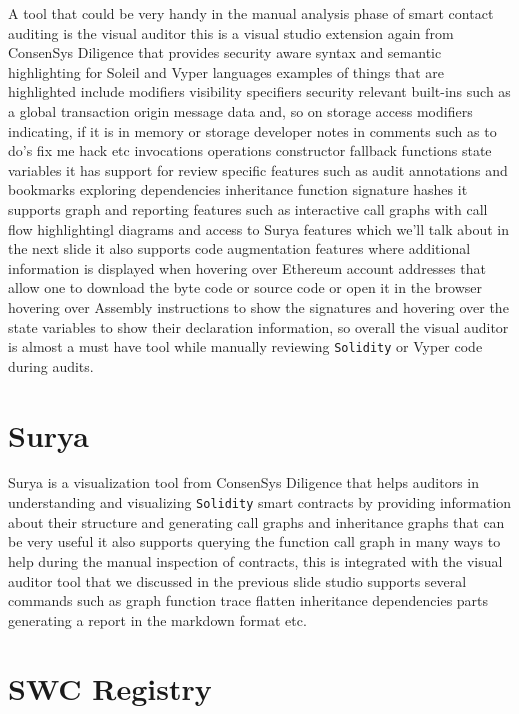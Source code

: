 A tool that could be very handy in the manual analysis phase of smart contact auditing is the visual auditor this is a visual studio extension again from ConsenSys Diligence that provides security aware syntax and semantic highlighting for Soleil and Vyper languages examples of things that are highlighted include modifiers visibility specifiers security relevant built-ins such as a global transaction origin message data and, so on storage access modifiers indicating, if it is in memory or storage developer notes in comments such as to do's fix me hack etc invocations operations constructor fallback functions state variables it has support for review specific features such as audit annotations and bookmarks exploring dependencies inheritance function signature hashes it supports graph and reporting features such as interactive call graphs with call flow highlightingl diagrams and access to Surya features which we'll talk about in the next slide it also supports code augmentation features where additional information is displayed when hovering over Ethereum account addresses that allow one to download the byte code or source code or open it in the browser hovering over Assembly instructions to show the signatures and hovering over the state variables to show their declaration information, so overall the visual auditor is almost a must have tool while manually reviewing \verb|Solidity| or Vyper code during audits.

\section{Surya}

Surya is a visualization tool from ConsenSys Diligence that helps auditors in understanding and visualizing \verb|Solidity| smart contracts by providing information about their structure and generating call graphs and inheritance graphs that can be very useful it also supports querying the function call graph in many ways to help during the manual inspection of contracts, this is integrated with the visual auditor tool that we discussed in the previous slide studio supports several commands such as graph function trace flatten inheritance dependencies parts generating a report in the markdown format etc.

\section{SWC Registry}

